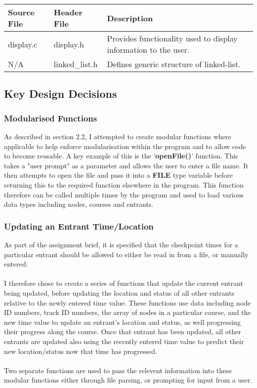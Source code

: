 \documentclass[12pt]{article}
\begin{document}
\begin{tabular}{| p{1.5cm} | p{1.5cm} | p{8cm} |}
\hline
Source File & Header File & Description \\
\hline
display.c & display.h & Provides functionality used to display information to the user. \\
\hline
N/A & linked\_list.h & Defines generic structure of linked-list. \\
\hline
\end{tabular}
\subsection{Key Design Decisions}

\subsubsection{Modularised Functions}

As described in section 2.2, I attempted to create modular functions where applicable to help enforce modularisation within the program and to allow code to become reusable. A key example of this is the '\textbf{openFile()}' function. This takes a "user prompt" as a parameter and allows the user to enter a file name. It then attempts to open the file and pass it into a \textbf{FILE} type variable before returning this to the required function elsewhere in the program. This function therefore can be called multiple times by the program and used to load various data types including nodes, courses and entrants.

\subsubsection{Updating an Entrant Time/Location}

As part of the assignment brief, it is specified that the checkpoint times for a particular entrant should be allowed to either be read in from a file, or manually entered. \\\\
I therefore chose to create a series of functions that update the current entrant being updated, before updating the location and status of all other entrants relative to the newly entered time value. These functions use data including node ID numbers, track ID numbers, the array of nodes in a particular course, and the new time value to update an entrant's location and status, as well progressing their progress along the course. Once that entrant has been updated, all other entrants are updated also using the recently entered time value to predict their new location/status now that time has progressed.\\\\
Two separate functions are used to pass the relevent information into these modular functions either through file parsing, or prompting for input from a user. 
\end{document}
